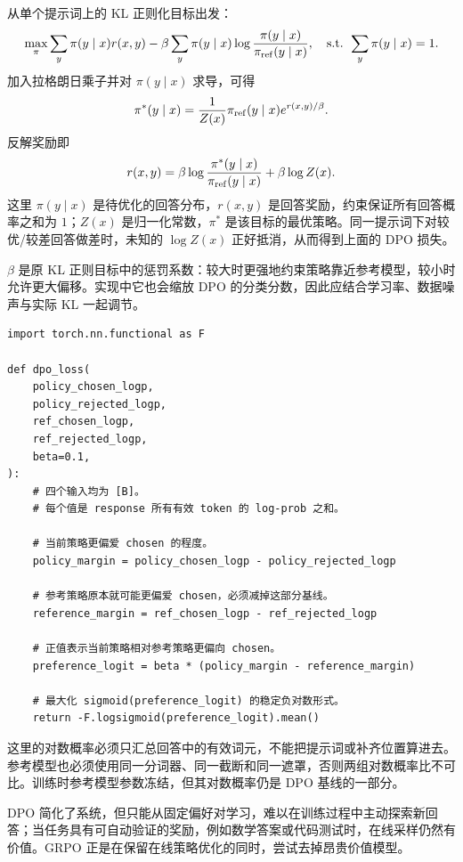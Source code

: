 \begin{mathbox}
从单个提示词上的 KL 正则化目标出发：
\[
\max_\pi\sum_y\pi(y\mid x)r(x,y)
-\beta\sum_y\pi(y\mid x)\log\frac{\pi(y\mid x)}{\pi_{\rm ref}(y\mid x)},
\quad \text{s.t. }\sum_y\pi(y\mid x)=1.
\]
加入拉格朗日乘子并对 $\pi(y\mid x)$ 求导，可得
\[
\pi^*(y\mid x)
=\frac{1}{Z(x)}\pi_{\rm ref}(y\mid x)e^{r(x,y)/\beta}.
\]
反解奖励即
\[
r(x,y)=\beta\log\frac{\pi^*(y\mid x)}{\pi_{\rm ref}(y\mid x)}+\beta\log Z(x).
\]
这里 $\pi(y\mid x)$ 是待优化的回答分布，$r(x,y)$ 是回答奖励，约束保证所有回答概率之和为 $1$；$Z(x)$ 是归一化常数，$\pi^*$ 是该目标的最优策略。同一提示词下对较优/较差回答做差时，未知的 $\log Z(x)$ 正好抵消，从而得到上面的 DPO 损失。
\end{mathbox}

$\beta$ 是原 KL 正则目标中的惩罚系数：较大时更强地约束策略靠近参考模型，较小时允许更大偏移。实现中它也会缩放 DPO 的分类分数，因此应结合学习率、数据噪声与实际 KL 一起调节。


\begin{lstlisting}
import torch.nn.functional as F

def dpo_loss(
    policy_chosen_logp,
    policy_rejected_logp,
    ref_chosen_logp,
    ref_rejected_logp,
    beta=0.1,
):
    # 四个输入均为 [B]。
    # 每个值是 response 所有有效 token 的 log-prob 之和。

    # 当前策略更偏爱 chosen 的程度。
    policy_margin = policy_chosen_logp - policy_rejected_logp

    # 参考策略原本就可能更偏爱 chosen，必须减掉这部分基线。
    reference_margin = ref_chosen_logp - ref_rejected_logp

    # 正值表示当前策略相对参考策略更偏向 chosen。
    preference_logit = beta * (policy_margin - reference_margin)

    # 最大化 sigmoid(preference_logit) 的稳定负对数形式。
    return -F.logsigmoid(preference_logit).mean()
\end{lstlisting}

这里的对数概率必须只汇总回答中的有效词元，不能把提示词或补齐位置算进去。参考模型也必须使用同一分词器、同一截断和同一遮罩，否则两组对数概率比不可比。训练时参考模型参数冻结，但其对数概率仍是 DPO 基线的一部分。

DPO 简化了系统，但只能从固定偏好对学习，难以在训练过程中主动探索新回答；当任务具有可自动验证的奖励，例如数学答案或代码测试时，在线采样仍然有价值。GRPO 正是在保留在线策略优化的同时，尝试去掉昂贵价值模型。

